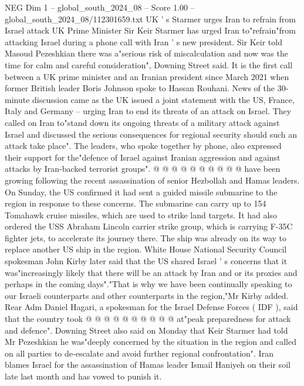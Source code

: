 \begin{textsample}{NEG Dim 1 – global\_south\_2024\_08 – Score 1.00 – global\_south\_2024\_08/112301659.txt}  \label{ex:f1_neg_127}
UK ' s Starmer urges Iran to refrain from Israel attack UK Prime Minister Sir Keir Starmer has urged Iran to"refrain"from attacking Israel during a phone call with Iran ' s new president.
Sir Keir told Masoud Pezeshkian there was a"serious risk of miscalculation and now was the time for calm and careful consideration", Downing Street said.
It is the first call between a UK prime minister and an Iranian president since March 2021 when former British leader Boris Johnson spoke to Hassan Rouhani.
News of the 30-minute discussion came as the UK issued a joint statement with the US, France, Italy and Germany -- urging Iran to end its threats of an attack on Israel.
They called on Iran to"stand down its ongoing threats of a military attack against Israel and discussed the serious consequences for regional security should such an attack take place".
The leaders, who spoke together by phone, also expressed their support for the"defence of Israel against Iranian aggression and against attacks by Iran-backed terrorist groups". @ @ @ @ @ @ @ @ @ @ have been growing following the recent assassination of senior Hezbollah and Hamas leaders.
On Sunday, the US confirmed it had sent a guided missile submarine to the region in response to these concerns.
The submarine can carry up to 154 Tomahawk cruise missiles, which are used to strike land targets.
It had also ordered the USS Abraham Lincoln carrier strike group, which is carrying F-35C fighter jets, to accelerate its journey there.
The ship was already on its way to replace another US ship in the region.
White House National Security Council spokesman John Kirby later said that the US shared Israel ' s concerns that it was"increasingly likely that there will be an attack by Iran and or its proxies and perhaps in the coming days"."That is why we have been continually speaking to our Israeli counterparts and other counterparts in the region,"Mr Kirby added.
Rear Adm Daniel Hagari, a spokesman for the Israel Defense Forces ( IDF ), said that the country took @ @ @ @ @ @ @ @ @ @ at"peak preparedness for attack and defence".
Downing Street also said on Monday that Keir Starmer had told Mr Pezeshkian he was"deeply concerned by the situation in the region and called on all parties to de-escalate and avoid further regional confrontation".
Iran blames Israel for the assassination of Hamas leader Ismail Haniyeh on their soil late last month and has vowed to punish it.

\end{textsample}
